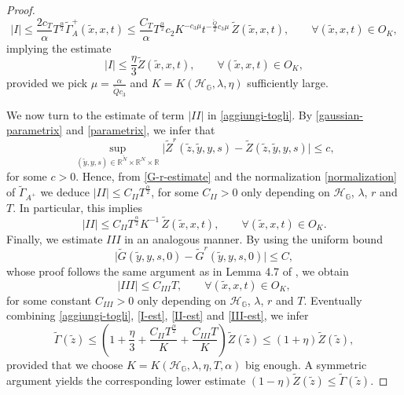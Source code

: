 \documentclass[11pt,a4paper]{article}
\numberwithin{equation}{section}
\newcommand{\R}{\mathbb{R}}
\def \rn {{\mathbb {R}}^{N}}
\def \rnm {{\mathbb {R}}^{\tilde N}}
\def \tt {\tilde}
\def \GG {{\mathbb{G}}}
\def \ti {\times}
\def \H {\mathscr{H}_\GG}
\def \a {{\alpha}}
\def \G {{\Gamma}}
\def \l {{\lambda}}
\def \y {{\eta}}
\begin{document}
{{\begin{proof}
	\begin{equation}\label{playa-grande}
		|I|\leq \frac{2 c_T}{\a} T^\frac{\a}{2}\tt\G_A^{+}(\tilde x,x,t) \leq \frac{C_T}{\a} T^\frac{\a}{2} c_2  K^{-c_3\mu} t^{-\frac{\tt Q}{2} c_3 \mu}\, \tt Z(\tilde x,x,t),\qquad \forall (\tt x, x,t)\in O_K,
	\end{equation}
	implying the estimate 
	\begin{equation}\label{I-est}
		|I|\leq \frac{\y}{3} \tt Z(\tt x,x, t),\qquad \forall (\tt x,x, t)\in O_K,
	\end{equation}	
	provided we pick $\mu = \frac{\a}{\tt Qc_3}$ and $K=K(\H,\l,\eta)$ sufficiently large. 
	
	
	We now turn to the estimate of term $|II|$ in \eqref{aggiungi-togli}. By \eqref{gaussian-parametrix} and \eqref{parametrix}, we infer that 
	\begin{equation}
		\sup_{(\tt y,y, s)\in\rnm\ti \rn\ti \R} \Big|\tt Z^r(\tt z, \tt y,y, s)-\tt Z(\tt z, \tt y,y, s)\Big|\leq c,
	\end{equation}
	for some $c>0$. Hence, from \eqref{G-r-estimate} and the normalization \eqref{normalization} of $\tt\G_{A^+}$ we deduce $|II|\leq C_{II} T^\frac{\a}{2}$, for some $C_{II}>0$ only depending on $\H$, $\l$, $r$ and $T$. In particular, this implies
	\begin{equation}\label{II-est}
		|II|\leq C_{II}T^\frac{\a}{2}K^{-1}\, \tt Z(\tilde x,x,t),\qquad \forall (\tt x,x, t)\in O_K.
	\end{equation} 
	Finally, we estimate $III$ in an analogous manner. By using the uniform bound
	\begin{equation}
		\big|\tt G (\tt y,y, s,0) -\tt G^r(\tt y,y, s,0)\big|\leq C, 
	\end{equation}
	whose proof follows the same argument as in Lemma 4.7 of \cite{polidoro-parametrix}, we obtain 
	\begin{equation}\label{III-est}
		|III|\leq C_{III} T,\qquad \forall (\tt x,x, t)\in O_K,
	\end{equation}	
	for some constant $C_{III}>0$ only depending on $\H$, $\l$, $r$ and $T$. Eventually combining \eqref{aggiungi-togli}, \eqref{I-est}, \eqref{II-est} and \eqref{III-est}, we infer
	\begin{equation*}
		\tt \G( \tt z)\leq \left(1+\frac{\eta}{3}+ \frac{C_{II}T^{\frac{\alpha}{2}}}{K}+\frac{C_{III}T}{K}\right)\tt Z(\tt z)\leq (1+\eta)\tt Z(\tt z),
	\end{equation*}  
	provided that we choose $K=K(\H,\l,\eta,T,\alpha)$ big enough. A symmetric argument yields the corresponding lower estimate $(1-\eta)\tt Z(\tt z)\leq \tt \G( \tt z)$. 
	


\end{proof}}}
\end{document}
